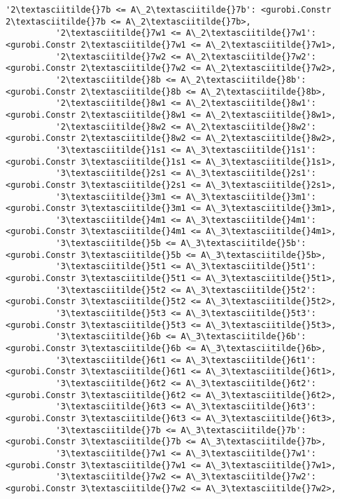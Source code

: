 \documentclass[11pt]{article}
\begin{document}
\begin{Verbatim}[commandchars=\\\{\}]
          '2\textasciitilde{}7b <= A\_2\textasciitilde{}7b': <gurobi.Constr 2\textasciitilde{}7b <= A\_2\textasciitilde{}7b>,
          '2\textasciitilde{}7w1 <= A\_2\textasciitilde{}7w1': <gurobi.Constr 2\textasciitilde{}7w1 <= A\_2\textasciitilde{}7w1>,
          '2\textasciitilde{}7w2 <= A\_2\textasciitilde{}7w2': <gurobi.Constr 2\textasciitilde{}7w2 <= A\_2\textasciitilde{}7w2>,
          '2\textasciitilde{}8b <= A\_2\textasciitilde{}8b': <gurobi.Constr 2\textasciitilde{}8b <= A\_2\textasciitilde{}8b>,
          '2\textasciitilde{}8w1 <= A\_2\textasciitilde{}8w1': <gurobi.Constr 2\textasciitilde{}8w1 <= A\_2\textasciitilde{}8w1>,
          '2\textasciitilde{}8w2 <= A\_2\textasciitilde{}8w2': <gurobi.Constr 2\textasciitilde{}8w2 <= A\_2\textasciitilde{}8w2>,
          '3\textasciitilde{}1s1 <= A\_3\textasciitilde{}1s1': <gurobi.Constr 3\textasciitilde{}1s1 <= A\_3\textasciitilde{}1s1>,
          '3\textasciitilde{}2s1 <= A\_3\textasciitilde{}2s1': <gurobi.Constr 3\textasciitilde{}2s1 <= A\_3\textasciitilde{}2s1>,
          '3\textasciitilde{}3m1 <= A\_3\textasciitilde{}3m1': <gurobi.Constr 3\textasciitilde{}3m1 <= A\_3\textasciitilde{}3m1>,
          '3\textasciitilde{}4m1 <= A\_3\textasciitilde{}4m1': <gurobi.Constr 3\textasciitilde{}4m1 <= A\_3\textasciitilde{}4m1>,
          '3\textasciitilde{}5b <= A\_3\textasciitilde{}5b': <gurobi.Constr 3\textasciitilde{}5b <= A\_3\textasciitilde{}5b>,
          '3\textasciitilde{}5t1 <= A\_3\textasciitilde{}5t1': <gurobi.Constr 3\textasciitilde{}5t1 <= A\_3\textasciitilde{}5t1>,
          '3\textasciitilde{}5t2 <= A\_3\textasciitilde{}5t2': <gurobi.Constr 3\textasciitilde{}5t2 <= A\_3\textasciitilde{}5t2>,
          '3\textasciitilde{}5t3 <= A\_3\textasciitilde{}5t3': <gurobi.Constr 3\textasciitilde{}5t3 <= A\_3\textasciitilde{}5t3>,
          '3\textasciitilde{}6b <= A\_3\textasciitilde{}6b': <gurobi.Constr 3\textasciitilde{}6b <= A\_3\textasciitilde{}6b>,
          '3\textasciitilde{}6t1 <= A\_3\textasciitilde{}6t1': <gurobi.Constr 3\textasciitilde{}6t1 <= A\_3\textasciitilde{}6t1>,
          '3\textasciitilde{}6t2 <= A\_3\textasciitilde{}6t2': <gurobi.Constr 3\textasciitilde{}6t2 <= A\_3\textasciitilde{}6t2>,
          '3\textasciitilde{}6t3 <= A\_3\textasciitilde{}6t3': <gurobi.Constr 3\textasciitilde{}6t3 <= A\_3\textasciitilde{}6t3>,
          '3\textasciitilde{}7b <= A\_3\textasciitilde{}7b': <gurobi.Constr 3\textasciitilde{}7b <= A\_3\textasciitilde{}7b>,
          '3\textasciitilde{}7w1 <= A\_3\textasciitilde{}7w1': <gurobi.Constr 3\textasciitilde{}7w1 <= A\_3\textasciitilde{}7w1>,
          '3\textasciitilde{}7w2 <= A\_3\textasciitilde{}7w2': <gurobi.Constr 3\textasciitilde{}7w2 <= A\_3\textasciitilde{}7w2>,

\end{Verbatim}
\end{document}

